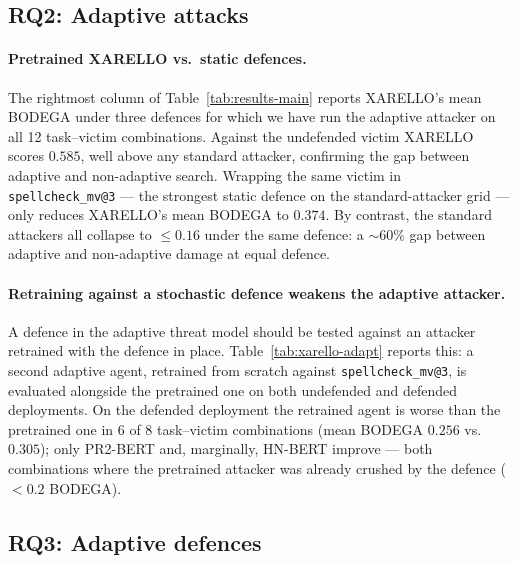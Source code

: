 \documentclass[11pt]{article}
\begin{document}
\subsection{RQ2: Adaptive attacks}
\label{sec:results-rq2}

\paragraph{Pretrained XARELLO vs.\ static defences.}
The rightmost column of Table~\ref{tab:results-main} reports XARELLO's mean BODEGA under three defences for which we have run the adaptive attacker on all 12 task--victim combinations. Against the undefended victim XARELLO scores $0.585$, well above any standard attacker, confirming the gap between adaptive and non-adaptive search. Wrapping the same victim in \texttt{spellcheck\_mv@3} --- the strongest static defence on the standard-attacker grid --- only reduces XARELLO's mean BODEGA to $0.374$. By contrast, the standard attackers all collapse to $\leq 0.16$ under the same defence: a $\sim 60\%$ gap between adaptive and non-adaptive damage at equal defence.

\paragraph{Retraining against a stochastic defence weakens the adaptive attacker.}
A defence in the adaptive threat model should be tested against an attacker retrained with the defence in place. Table~\ref{tab:xarello-adapt} reports this: a second adaptive agent, retrained from scratch against \texttt{spellcheck\_mv@3}, is evaluated alongside the pretrained one on both undefended and defended deployments. On the defended deployment the retrained agent is worse than the pretrained one in 6 of 8 task--victim combinations (mean BODEGA $0.256$ vs.\ $0.305$); only PR2-BERT and, marginally, HN-BERT improve --- both combinations where the pretrained attacker was already crushed by the defence ($<\!0.2$ BODEGA). 




\subsection{RQ3: Adaptive defences}
\label{sec:results-rq3}
\end{document}
